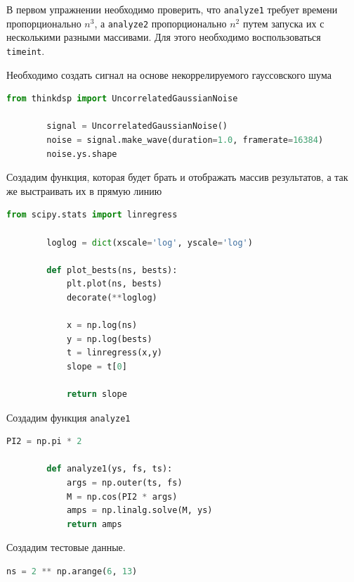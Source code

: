 \documentclass[a4paper, 14pt]{extarticle}
\begin{document}
    В первом упражнении необходимо проверить, что \texttt{analyze1} требует времени пропорционально \texttt{\(n^3\)}, а \texttt{analyze2} пропорционально \texttt{\(n^2\)} путем запуска их с несколькими разными массивами.
    Для этого необходимо воспользоваться \texttt{timeint}.

    Необходимо создать сигнал на основе некоррелируемого гауссовского шума

    \begin{lstlisting}[language=Python, caption= Создание сигнал на основе некоррелируемого гауссовского шума, label={lst:make_signal}]
        from thinkdsp import UncorrelatedGaussianNoise

        signal = UncorrelatedGaussianNoise()
        noise = signal.make_wave(duration=1.0, framerate=16384)
        noise.ys.shape
    \end{lstlisting}

    Создадим функция, которая будет брать и отображать массив результатов, а так же выстраивать их в прямую линию

    \begin{lstlisting}[language=Python, caption=Функция plot\_bests, label={lst:plot_bests}]
        from scipy.stats import linregress

        loglog = dict(xscale='log', yscale='log')

        def plot_bests(ns, bests):
            plt.plot(ns, bests)
            decorate(**loglog)

            x = np.log(ns)
            y = np.log(bests)
            t = linregress(x,y)
            slope = t[0]

            return slope
    \end{lstlisting}

    Создадим функция \texttt{analyze1}

    \begin{lstlisting}[language=Python, caption= Функция analyze1, label={lst:analyze1}]
        PI2 = np.pi * 2

        def analyze1(ys, fs, ts):
            args = np.outer(ts, fs)
            M = np.cos(PI2 * args)
            amps = np.linalg.solve(M, ys)
            return amps
    \end{lstlisting}

    Создадим тестовые данные.

    \begin{lstlisting}[language=Python, caption= Создание тестовых данных, label={lst:make_test_data}]
        ns = 2 ** np.arange(6, 13)
    \end{lstlisting}
\end{document}
